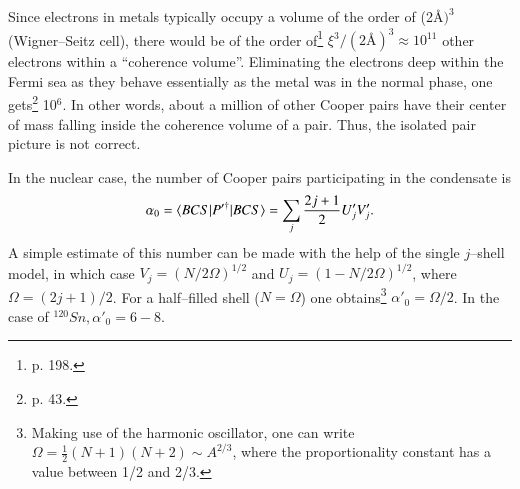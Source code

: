 \begin{subappendices}
Since electrons in metals typically occupy a volume of the order of (2\AA$)^3$ (Wigner--Seitz cell), there would be of the order of\footnote{\cite{Ketterson:99} p. 198.} $\xi^3/(2\text{\AA})^3\approx 10^{11}$ other electrons within a ``coherence volume''. Eliminating the electrons deep within the Fermi sea as they behave essentially as the metal was in the normal phase, one gets\footnote{\cite{Schrieffer:64} p. 43.} 10$^6$. In other words, about a million of other Cooper pairs have their center of mass falling inside the coherence volume of a pair. Thus, the isolated pair picture is not correct.





 


 In the nuclear case, the number of Cooper pairs participating in the condensate is
 \begin{align}\label{eq3B11}
\alpha_0=\langle {BCS|P'^\dagger|BCS} \rangle=\sum_j\frac{2j+1}{2}U'_jV'_j.
 \end{align}
 A simple estimate of this number can be made with the help of the single $j$--shell model, in which case $V_j=(N/2\Omega)^{1/2}$ and $U_j=(1-N/2\Omega)^{1/2}$, where $\Omega=(2j+1)/2$. For a half--filled shell ($N=\Omega$) one obtains\footnote{Making use of the harmonic oscillator, one can write $\Omega=\frac{1}{2}(N+1)(N+2)\sim A^{2/3}$, where the proportionality constant has a value between 1/2 and 2/3.} $\alpha'_0=\Omega/2$. In the case of $^{120}Sn, \alpha'_0=6-8$. 
 

\end{subappendices}
